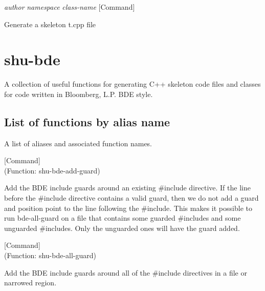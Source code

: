 \vspace{1em}
\noindent
{}
\usebox{\funcname}\emph{author} \emph{namespace} \emph{class-name}
 \hfill [Command]

\begin{doc-string}
Generate a skeleton t.cpp file
\end{doc-string}

\eject
\section{shu-bde}


A collection of useful functions for generating C++ skeleton code files
and classes for code written in Bloomberg, L.P. BDE style.


\subsection{List of functions by alias name}

A list of aliases and associated function names.



\vspace{1em}
\noindent
{}
\usebox{\funcname}
 \hfill [Command]\\%
 (Function: shu-bde-add-guard)

\begin{doc-string}
Add the BDE include guards around an existing \#include directive.  If the line
before the \#include directive contains a valid guard, then we do not add a guard
and position point to the line following the \#include.  This makes it possible to
run bde-all-guard on a file that contains some guarded \#includes and some unguarded
\#includes.  Only the unguarded ones will have the guard added.
\end{doc-string}

\vspace{1em}
\noindent
{}
\usebox{\funcname}
 \hfill [Command]\\%
 (Function: shu-bde-all-guard)

\begin{doc-string}
Add the BDE include guards around all of the \#include directives in a file
or narrowed region.
\end{doc-string}

